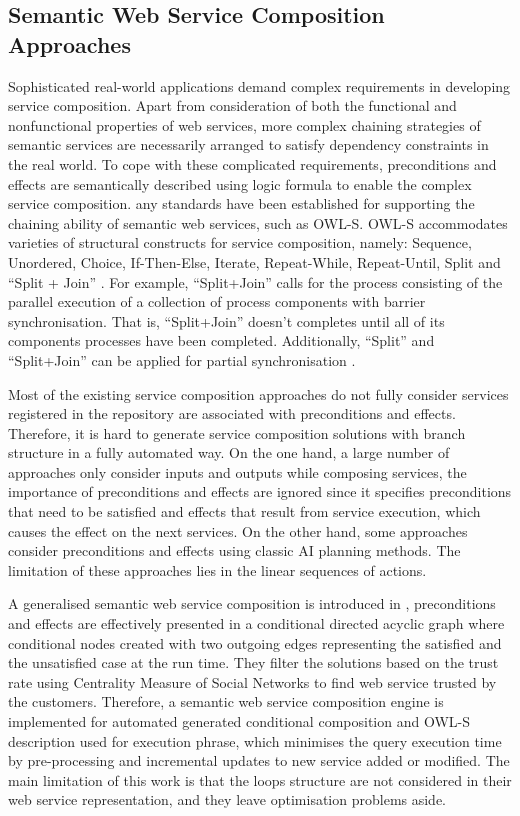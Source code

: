 \subsection{Semantic Web Service Composition Approaches}\label{Semantic}
Sophisticated real-world applications demand complex requirements in developing service composition. Apart from consideration of both the functional and nonfunctional properties of web services, more complex chaining strategies of semantic services are necessarily arranged to satisfy dependency constraints in the real world. To cope with these complicated requirements, preconditions and effects are semantically described using logic formula to enable the complex service composition. any standards have been established for supporting the chaining ability of semantic web services, such as OWL-S. OWL-S accommodates varieties of structural constructs for service composition, namely: Sequence, Unordered, Choice, If-Then-Else, Iterate, Repeat-While, Repeat-Until, Split and ``Split + Join'' \cite{wang2014automated}. For example, ``Split+Join'' calls for the process consisting of the parallel execution of a collection of process components with barrier synchronisation. That is, ``Split+Join'' doesn't completes until all of its components processes have been completed. Additionally, ``Split'' and ``Split+Join'' can be applied for partial synchronisation \cite{wang2014automated}.

Most of the existing service composition approaches do not fully consider services registered in the repository are associated with preconditions and effects.  Therefore, it is hard to generate service composition solutions with branch structure in a fully automated way. On the one hand,  a large number of approaches \cite{} only consider inputs and outputs while composing services, the importance of preconditions and effects are ignored since it specifies preconditions that need to be satisfied and effects that result from service execution,  which causes the effect on the next services. On the other hand, some approaches consider preconditions and effects using classic AI planning methods. The limitation of these approaches lies in the linear sequences of actions.


A generalised semantic web service composition is introduced in \cite{bansal2016generalized}, preconditions and effects are effectively presented in a conditional directed acyclic graph where conditional nodes created with two outgoing edges representing the satisfied and the unsatisfied case at the run time. They filter the solutions based on the trust rate using Centrality Measure of Social Networks to find web service trusted by the customers. Therefore, a semantic web service composition engine is implemented for automated generated conditional composition and OWL-S description used for execution phrase, which minimises the query execution time by pre-processing and incremental updates to new service added or modified. The main limitation of this work is that the loops structure are not considered in their web service representation, and they leave optimisation problems aside.

